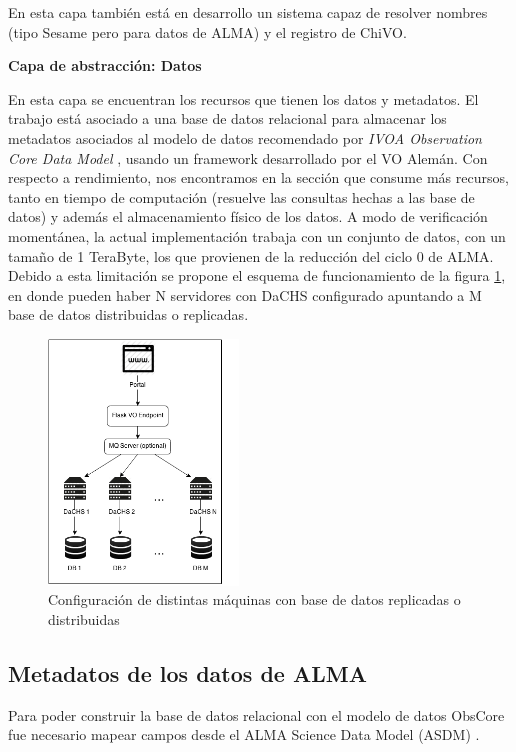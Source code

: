 En esta capa también está en desarrollo un sistema capaz de resolver nombres
(tipo Sesame \cite{sesame} pero para datos de ALMA) y el registro de ChiVO.

\textbf{Capa de abstracción: Datos}

En esta capa se encuentran los recursos que tienen los datos y metadatos.
El trabajo está asociado a una base de datos relacional para almacenar los
metadatos asociados al modelo de datos recomendado por \emph{IVOA Observation Core
Data Model} \cite{louys2011ivoa}, usando un framework desarrollado por el VO Alemán.
Con respecto a rendimiento, nos encontramos en la sección que consume más
recursos, tanto en tiempo de computación (resuelve las consultas hechas a las base
de datos) y además el almacenamiento físico de los datos.
A modo de verificación momentánea,
la actual implementación trabaja con un conjunto de datos, con un tamaño
de 1 TeraByte, los que provienen de la reducción del ciclo 0 de ALMA.
Debido a esta limitación se propone
el esquema de funcionamiento de la figura \ref{fig:dachs}, en donde pueden haber N
servidores con DaCHS configurado apuntando a M base de datos distribuidas o replicadas.

\begin{figure}[ht]
    \centering
    \includegraphics[width=0.45\textwidth]{images/interaccion.png}
    \caption{Configuración de distintas máquinas con base de datos replicadas o distribuidas}
    \label{fig:dachs}
\end{figure}

\subsection{Metadatos de los datos de ALMA}

Para poder construir la base de datos relacional con el modelo de datos ObsCore fue
necesario mapear campos desde el ALMA Science Data Model (ASDM) \cite{viallefond2009sdm}.

